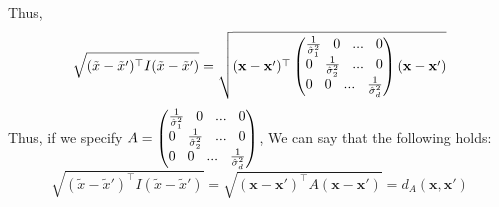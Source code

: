 \documentclass[a4paper]{article}
\theoremstyle{definition}
\def\x{\mathbf x}
\newenvironment{soln}{
    \leavevmode\color{blue}\ignorespaces
}{}
\begin{document}
\begin{enumerate}
\begin{soln}
	
Thus, 
	$$
	\sqrt{(\tilde x-\tilde x')^\top I (\tilde x-\tilde x')} = 
	\sqrt{(\x - \x')^\top
	\begin{pmatrix}
		\frac{1}{\hat \sigma_1^2} \hspace{0.3cm}0 \hspace{0.3cm} ...\hspace{0.3cm}0 \\
		0\hspace{0.3cm} \frac{1}{\hat \sigma_2^2} \hspace{0.3cm} ...\hspace{0.3cm}0 \\
		0\hspace{0.3cm} 0 \hspace{0.3cm} ... \hspace{0.3cm} \frac{1}{\hat \sigma_d^2} 
	\end{pmatrix}(\x - \x')}
	$$
	Thus, if we specify $A = \begin{pmatrix}
	\frac{1}{\hat \sigma_1^2} \hspace{0.3cm}0 \hspace{0.3cm} ...\hspace{0.3cm}0 \\
	0\hspace{0.3cm} \frac{1}{\hat \sigma_2^2} \hspace{0.3cm} ...\hspace{0.3cm}0 \\
	0\hspace{0.3cm} 0 \hspace{0.3cm} ... \hspace{0.3cm} \frac{1}{\hat \sigma_d^2} 
	\end{pmatrix}$,
	We can say that the following holds:
	$$
	\sqrt{(\tilde x-\tilde x')^\top I (\tilde x-\tilde x')} = \sqrt{(\x - \x')^\top A (\x - \x')} = d_A(\x,\x')
	$$
	
%	
	

\end{soln}
\end{enumerate}
\end{document}
